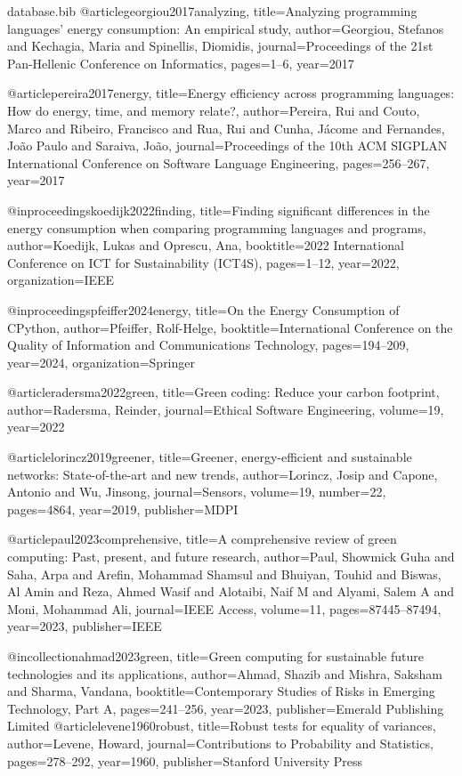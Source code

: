 \begin{filecontents*}{database.bib}
@article{georgiou2017analyzing,
  title={Analyzing programming languages' energy consumption: An empirical study},
  author={Georgiou, Stefanos and Kechagia, Maria and Spinellis, Diomidis},
  journal={Proceedings of the 21st Pan-Hellenic Conference on Informatics},
  pages={1--6},
  year={2017}
}

@article{pereira2017energy,
  title={Energy efficiency across programming languages: How do energy, time, and memory relate?},
  author={Pereira, Rui and Couto, Marco and Ribeiro, Francisco and Rua, Rui and Cunha, J{\'a}come and Fernandes, Jo{\~a}o Paulo and Saraiva, Jo{\~a}o},
  journal={Proceedings of the 10th ACM SIGPLAN International Conference on Software Language Engineering},
  pages={256--267},
  year={2017}
}

@inproceedings{koedijk2022finding,
  title={Finding significant differences in the energy consumption when comparing programming languages and programs},
  author={Koedijk, Lukas and Oprescu, Ana},
  booktitle={2022 International Conference on ICT for Sustainability (ICT4S)},
  pages={1--12},
  year={2022},
  organization={IEEE}
}

@inproceedings{pfeiffer2024energy,
  title={On the Energy Consumption of CPython},
  author={Pfeiffer, Rolf-Helge},
  booktitle={International Conference on the Quality of Information and Communications Technology},
  pages={194--209},
  year={2024},
  organization={Springer}
}

@article{radersma2022green,
  title={Green coding: Reduce your carbon footprint},
  author={Radersma, Reinder},
  journal={Ethical Software Engineering},
  volume={19},
  year={2022}
}

@article{lorincz2019greener,
  title={Greener, energy-efficient and sustainable networks: State-of-the-art and new trends},
  author={Lorincz, Josip and Capone, Antonio and Wu, Jinsong},
  journal={Sensors},
  volume={19},
  number={22},
  pages={4864},
  year={2019},
  publisher={MDPI}
}

@article{paul2023comprehensive,
  title={A comprehensive review of green computing: Past, present, and future research},
  author={Paul, Showmick Guha and Saha, Arpa and Arefin, Mohammad Shamsul and Bhuiyan, Touhid and Biswas, Al Amin and Reza, Ahmed Wasif and Alotaibi, Naif M and Alyami, Salem A and Moni, Mohammad Ali},
  journal={IEEE Access},
  volume={11},
  pages={87445--87494},
  year={2023},
  publisher={IEEE}
}

@incollection{ahmad2023green,
  title={Green computing for sustainable future technologies and its applications},
  author={Ahmad, Shazib and Mishra, Saksham and Sharma, Vandana},
  booktitle={Contemporary Studies of Risks in Emerging Technology, Part A},
  pages={241--256},
  year={2023},
  publisher={Emerald Publishing Limited}
}
@article{levene1960robust,
  title={Robust tests for equality of variances},
  author={Levene, Howard},
  journal={Contributions to Probability and Statistics},
  pages={278--292},
  year={1960},
  publisher={Stanford University Press}
}


\end{filecontents*}
